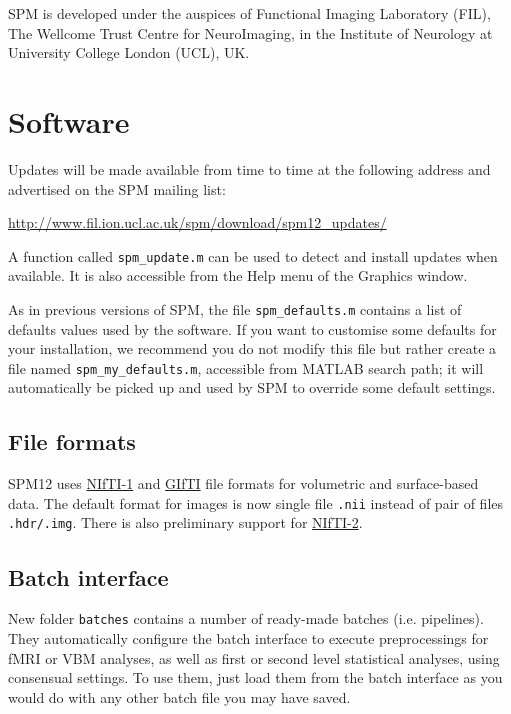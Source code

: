 \documentclass[a4paper,titlepage,openany]{article}
\begin{document}
SPM is developed under the auspices of Functional Imaging Laboratory (FIL), The Wellcome Trust Centre for NeuroImaging, in the Institute of Neurology at University College London (UCL), UK.

\vspace{10mm}

\section{Software}
Updates will be made available from time to time at the following address and advertised on the SPM mailing list:

\qquad \url{http://www.fil.ion.ucl.ac.uk/spm/download/spm12_updates/}

A function called \texttt{spm\_update.m} can be used to detect and install updates when available. It is also accessible from the Help menu of the Graphics window.

As in previous versions of SPM, the file \texttt{spm\_defaults.m} contains a list of defaults values used by the software. If you want to customise some defaults for your installation, we recommend you do not modify this file but rather create a file named \texttt{spm\_my\_defaults.m}, accessible from MATLAB search path; it will automatically be picked up and used by SPM to override some default settings.

\subsection{File formats}
SPM12 uses \href{http://nifti.nimh.nih.gov/nifti-1}{NIfTI-1} and \href{http://www.nitrc.org/projects/gifti/}{GIfTI} file formats for volumetric and surface-based data. The default format for images is now single file \texttt{.nii} instead of pair of files \texttt{.hdr/.img}. There is also preliminary support for \href{http://nifti.nimh.nih.gov/nifti-2}{NIfTI-2}.

\subsection{Batch interface}
New folder \texttt{batches} contains a number of ready-made batches (i.e. pipelines). They automatically configure the batch interface to execute preprocessings for fMRI or VBM analyses, as well as first or second level statistical analyses, using consensual settings. To use them, just load them from the batch interface as you would do with any other batch file you may have saved.
\end{document}
